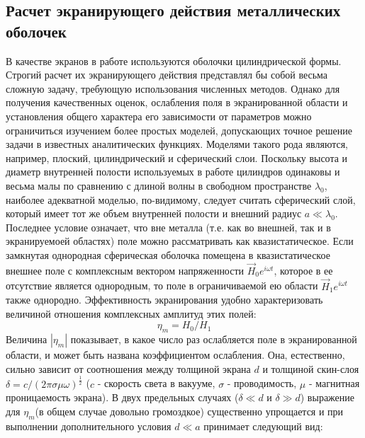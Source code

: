 \subsection{Расчет экранирующего действия металлических
оболочек}

В качестве экранов в работе используются оболочки цилиндрической формы. Строгий расчет их экранирующего действия представлял бы собой весьма сложную задачу, требующую использования численных методов. Однако для получения качественных оценок, ослабления поля в экранированной области и установления общего характера его зависимости от параметров можно ограничиться изучением более простых моделей, допускающих точное решение задачи в известных аналитических функциях. Моделями такого рода являются, например, плоский, цилиндрический и сферический слои. Поскольку высота и диаметр внутренней полости используемых в работе цилиндров одинаковы и весьма малы по сравнению с длиной волны в свободном пространстве $\lambda_0$, наиболее адекватной моделью, по-видимому, следует считать сферический слой, который имеет тот же объем внутренней полости и внешний радиус $a \ll \lambda_0$. Последнее условие означает, что вне металла (т.е. как во внешней, так и в экранируемоей областях) поле можно рассматривать как квазистатическое.
Если замкнутая однородная сферическая оболочка помещена в квазистатическое внешнее поле с комплексным вектором напряженности $\vec{H}_{0} e^{i \omega t}$, которое в ее отсутствие является однородным, то поле в ограничиваемой ею области $\vec{H}_{1} e^{i \omega t}$ также однородно. Эффективность экранирования удобно характеризовать величиной отношения комплексных амплитуд этих полей:
\begin{equation} 
\eta_{m}=H_{0} / H_{1}
\label{eq:1}
\end{equation}
Величина $|\eta_{m}|$ показывает, в какое число раз ослабляется поле в экранированной области, и может быть названа коэффициентом ослабления. Она, естественно, сильно зависит от соотношения между толщиной экрана $d$ и толщиной скин-слоя $\delta=c/(2\pi\sigma\mu\omega)^{\frac{1}{2}}$ ($c$ - скорость света в вакууме, $\sigma$ - проводимость, $\mu$ - магнитная проницаемость экрана). В двух предельных случаях ($\delta \ll d$  и $\delta \gg d$) выражение для $\eta_{m}$(в общем случае довольно громоздкое) существенно упрощается и при выполнении дополнительного условия $d \ll a$ принимает следующий вид:

